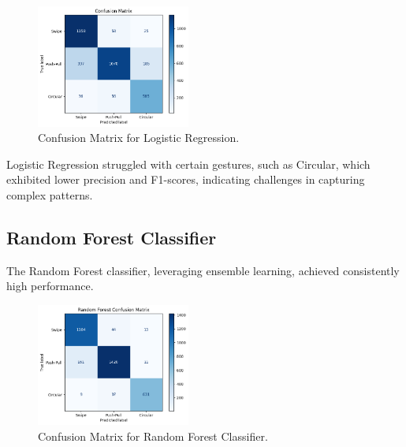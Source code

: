 \documentclass[10pt,twocolumn,letterpaper]{article}
\begin{document}
\begin{figure}[h]
  \centering
  \includegraphics[width=0.45\textwidth]{figures/confusion_matrix_lr.png}
  \caption{Confusion Matrix for Logistic Regression.}
  \label{fig:confusion_matrix_lr}
\end{figure}

Logistic Regression struggled with certain gestures, such as Circular, which exhibited lower precision and F1-scores, indicating challenges in capturing complex patterns.

\subsection{Random Forest Classifier}

The Random Forest classifier, leveraging ensemble learning, achieved consistently high performance.

\begin{table}[h]
\small
\begin{center}
\caption{Performance Metrics for Random Forest Classifier}
\vspace{0.1cm}
\end{center}
\end{table}

\begin{figure}[h]
  \centering
  \includegraphics[width=0.45\textwidth]{figures/confusion_matrix_rf.png}
  \caption{Confusion Matrix for Random Forest Classifier.}
  \label{fig:confusion_matrix_rf}
\end{figure}
\end{document}

